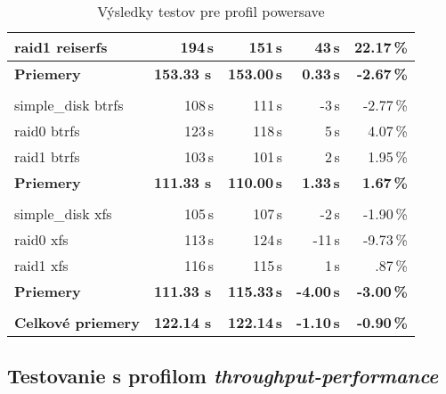 \begin{table}[H]
\begin{center}
\begin{tabular}{|l|r r r r|}
    raid1 reiserfs & 194\,s & 151\,s & 43\,s & 22.17\,\% \\
    \hline
    \textbf{Priemery} & \textbf{153.33 s}\,& \textbf{153.00\,s} & \textbf{0.33\,s} & \textbf{-2.67\,\%} \\
    \hline & \\[-1em]\hline
    simple\_disk btrfs & 108\,s & 111\,s & -3\,s & -2.77\,\% \\
    raid0 btrfs & 123\,s & 118\,s & 5\,s & 4.07\,\% \\
    raid1 btrfs & 103\,s & 101\,s & 2\,s & 1.95\,\% \\
    \hline
    \textbf{Priemery} & \textbf{111.33 s}\,& \textbf{110.00\,s} & \textbf{1.33\,s} & \textbf{1.67\,\%} \\
    \hline & \\[-1em]\hline
    simple\_disk xfs & 105\,s & 107\,s & -2\,s & -1.90\,\% \\
    raid0 xfs & 113\,s & 124\,s & -11\,s & -9.73\,\% \\
    raid1 xfs & 116\,s & 115\,s & 1\,s & .87\,\% \\
    \hline
    \textbf{Priemery} & \textbf{111.33 s}\,& \textbf{115.33\,s} & \textbf{-4.00\,s} & \textbf{-3.00\,\%} \\
    \hline & \\[-1em]\hline
    \textbf{Celkové priemery} & \textbf{122.14 s}\,& \textbf{122.14\,s} & \textbf{-1.10\,s} & \textbf{-0.90\,\%} \\
    \hline
\end{tabular}
\caption{Výsledky testov pre profil powersave}
\label{tab:results-xfs}
\end{center}
\end{table}

\subsection{Testovanie s profilom \emph{throughput-performance}}

